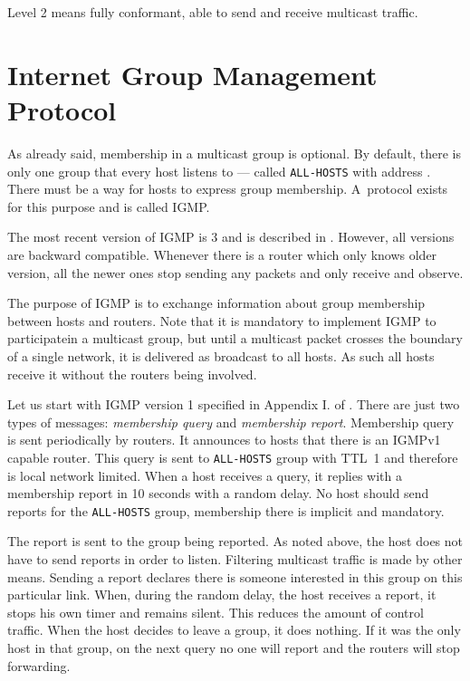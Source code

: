 Level 2 means fully conformant, able to send and receive multicast traffic.

\section{Internet Group Management Protocol}

As already said, membership in a multicast group is optional. By default, there
is only one group that every host listens to --- called \texttt{ALL-HOSTS} with address
. There must be a way for hosts to express group membership.
A~protocol exists for this purpose and is called IGMP.

The most recent version of IGMP is 3 and is described in . However, all
versions are backward compatible. Whenever there is a router which only knows
older version, all the newer ones stop sending any packets and only receive and observe.

The purpose of IGMP is to exchange information about group membership between
hosts and routers. Note that it is mandatory to implement IGMP to participatein
a multicast group, but until a multicast packet crosses the boundary of a single network, it
is delivered as broadcast to all hosts. As such all hosts receive it without
the routers being involved.

Let us start with IGMP version 1 specified in Appendix I. of . There
are just two types of messages: \emph{membership query} and \emph{membership report}.
Membership query is sent periodically by routers. It announces to hosts that there
is an IGMPv1 capable router. This query is sent to \texttt{ALL-HOSTS} group with TTL~1 and
therefore is local network limited. When a host receives a query, it replies with
a membership report in 10 seconds with a random delay. No host should send
reports for the \texttt{ALL-HOSTS} group, membership there is implicit and mandatory.

The report is sent to the group being reported. As noted above, the host does not have
to send reports in order to listen. Filtering multicast traffic is made by other means.
Sending a report declares there is someone interested in this group on this
particular link. When, during the random delay, the host receives a report, it
stops his own timer and remains silent. This reduces the amount of control
traffic. When the host decides to leave a group, it does nothing. If it was the
only host in that group, on the next query no one will report and the routers will
stop forwarding.

